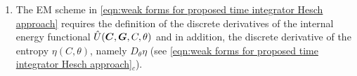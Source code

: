 \begin{enumerate}
\item The EM scheme in \eqref{eqn:weak forms for proposed time integrator Hesch approach} requires the definition of the discrete derivatives of the internal energy functional $\hat{U}(\boldsymbol{C},\boldsymbol{G},C,\theta)$ and in addition, the discrete derivative of the entropy $\eta(C,\theta)$, namely $D_{\theta}\eta$ (see \eqref{eqn:weak forms for proposed time integrator Hesch approach}$_c$).

\end{enumerate}


%
%
